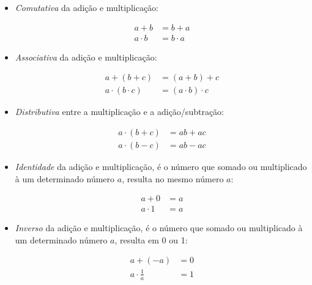 \documentclass[pdftex, brazil, 12pt, twoside]{article}
\begin{document}
\begin{itemize}[noitemsep]
\item \emph{Comutativa} da adição e multiplicação:

  \begin{equation*}
    \begin{split}
      a + b &= b + a\\
      a \cdot b &= b \cdot a
    \end{split}
  \end{equation*}

\item \emph{Associativa} da adição e multiplicação:

  \begin{equation*}
    \begin{split}
      a + (b + c) &= (a + b) + c\\
      a \cdot (b \cdot c) &= (a \cdot b) \cdot c
    \end{split}
  \end{equation*}

\item \emph{Distributiva} entre a multiplicação e a adição/subtração:

  \begin{equation*}
    \begin{split}
      a \cdot (b + c) &= ab + ac\\
      a \cdot (b - c) &= ab - ac
    \end{split}
  \end{equation*}

\item \emph{Identidade} da adição e multiplicação, é o número que somado ou multiplicado
  à um determinado número $a$, resulta no mesmo número $a$:

  \begin{equation*}
    \begin{split}
      a + 0 &= a\\
      a \cdot 1 &= a
    \end{split}
  \end{equation*}

\item \emph{Inverso} da adição e multiplicação, é o número que somado ou multiplicado
  à um determinado número $a$, resulta em 0 ou 1:

  \begin{equation*}
    \begin{split}
      a + (-a) &= 0\\
      a \cdot \frac{1}{a} &= 1
    \end{split}
  \end{equation*}
  
\end{itemize}
\end{document}
